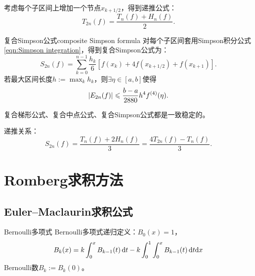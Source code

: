 \begin{corollary}
    考虑每个子区间上增加一个节点$x_{k+1/2}$，得到递推公式：
    \begin{equation}
        T_{2n}(f) = \frac{T_n(f) + H_n(f)}2.
    \end{equation}
\end{corollary}

\begin{example}
    {复合Simpson公式}{composite Simpson formula}
    对每个子区间套用Simpson积分公式\eqref{eqn:Simpson integration}，得到复合Simpson公式为：
    \begin{equation}
        S_{2n}(f) = \sum_{k=0}^{n-1}\frac{h_k}6[f(x_k) + 4f(x_{k+1/2}) + f(x_{k+1})].
    \end{equation}
    若最大区间长度$\textstyle h := \max_kh_k$，则$\exists\eta \in [a,b]$使得
    \begin{equation}
        \lvert E_{2n}(f)\rvert \leqslant \frac{b - a}{2880}h^4f^{(4)}(\eta).
    \end{equation}
\end{example}

\begin{remark}
    复合梯形公式、复合中点公式、复合Simpson公式都是一致稳定的。
\end{remark}

\begin{corollary}
    递推关系：
    \begin{equation}
        S_{2n}(f) = \frac{T_n(f) + 2H_n(f)}3 = \frac{4T_{2n}(f) - T_n(f)}3.
    \end{equation}
\end{corollary}

\section{Romberg求积方法}
\label{sec:Romberg's method}

\subsection{Euler--Maclaurin求积公式}

\begin{definition}
    {Bernoulli多项式}{}
    Bernoulli多项式递归定义：$B_0(x) = 1$，
    \begin{equation}
        B_k(x) = k\int_0^xB_{k-1}(t)\mathop{}\!\mathrm{d} t - k\int_0^1\int_0^xB_{k-1}(t)\mathop{}\!\mathrm{d} t\mathrm{d} x
    \end{equation}
    Bernoulli数$B_k := B_k(0)$。
\end{definition}

